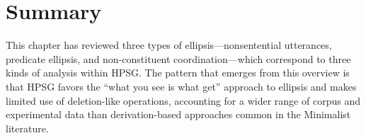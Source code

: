 %
 
%
%
%
%
%

%
%
%
%
%
%
%
%
%
%
%
%
%





\section{Summary}
\label{sum}
This chapter has reviewed three types of ellipsis---nonsentential utterances, predicate ellipsis, and non-constituent coordination---which correspond to three kinds of analysis within HPSG. The pattern that emerges from this overview is that HPSG favors the ``what you see is what get'' approach to ellipsis and makes limited use of deletion-like operations, %
 accounting for a wider range of corpus and experimental data %
 than derivation-based approaches common in the Minimalist literature.



